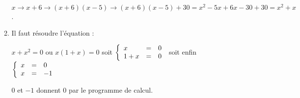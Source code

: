 \begin{enumerate}
\begin{enumerate}
$x \to x + 6 \to (x + 6)(x - 5) \to (x + 6)(x - 5) + 30 = x^2 - 5x + 6x - 30 + 30 = x^2 + x$. 
		\item  %
Il faut résoudre l'équation :
		
$x + x^2 = 0$ ou $x(1 + x) = 0$ soit $\left\{\begin{array}{l c l}
x&=&0\\
1 + x&=&0
\end{array}\right.$ soit enfin  $\left\{\begin{array}{l c l}
x&=&0\\
x&=&- 1
\end{array}\right.$

$0$ et $- 1$ donnent $0$ par le programme de calcul.
	\end{enumerate}
\end{enumerate}

\bigskip

